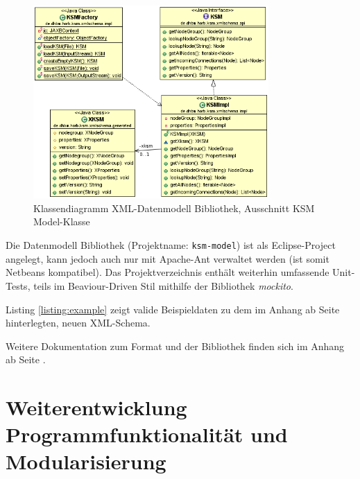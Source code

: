 \documentclass[%
12pt,titlepage,abstracton,DIV=10,BCOR=0.5cm]{scrreprt}
\begin{document}
\begin{figure}[ht!]
  \centering
\includegraphics[width=0.8\textwidth]{images/class-diagram-xmlschema.PNG}
\caption{Klassendiagramm XML-Datenmodell Bibliothek, Ausschnitt KSM
Model-Klasse}
\label{fig:class-diagram-xmlschema}
\end{figure}

Die Datenmodell Bibliothek (Projektname:
\texttt{ksm-model}) ist als Eclipse-Project angelegt, kann jedoch auch nur mit
Apache-Ant verwaltet werden (ist somit Netbeans kompatibel). Das Projektverzeichnis enthält weiterhin
umfassende Unit-Tests, teils im Beaviour-Driven Stil mithilfe der Bibliothek
\textit{mockito}.

Listing \ref{listing:example} zeigt valide Beispieldaten zu dem im Anhang ab
Seite \pageref{listing:schema} hinterlegten, neuen XML-Schema.

\label{listing:example}


Weitere Dokumentation zum Format und der Bibliothek finden sich im Anhang ab
Seite \pageref{chapter:doku-datamodel}.


\chapter{Weiterentwicklung Programmfunktionalität und
Modularisierung}\label{chapter:weiterentwicklung}
\end{document}
